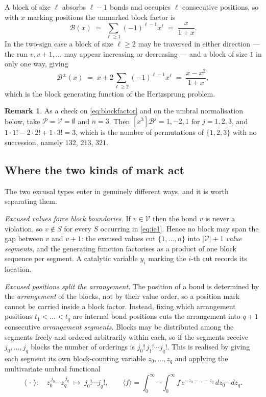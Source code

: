 \documentclass[11pt]{article}
\theoremstyle{definition}
\newtheorem{remark}[theorem]{Remark}
\begin{document}
A block of size $\ell$ absorbs $\ell-1$ bonds and occupies $\ell$ consecutive
positions, so with $x$ marking positions the unmarked block factor is
\begin{equation}\label{eq:blockfactor}
  \mathcal{B}(x)\;=\;\sum_{\ell\ge 1}(-1)^{\ell-1}x^{\ell}\;=\;\frac{x}{1+x} .
\end{equation}
In the two-sign case a block of size $\ell\ge 2$ may be traversed in either
direction --- the run $v,v+1,\dots$ may appear increasing or decreasing --- and
a block of size $1$ in only one way, giving
\begin{equation}\label{eq:blockfactorpm}
  \mathcal{B}^{\pm}(x)\;=\;x+2\sum_{\ell\ge 2}(-1)^{\ell-1}x^{\ell}
  \;=\;\frac{x-x^{2}}{1+x},
\end{equation}
which is the block generating function of the Hertzsprung problem.

\begin{remark}
As a check on \eqref{eq:blockfactor} and on the umbral normalisation below,
take $\mathcal{P}=\mathcal{V}=\emptyset$ and $n=3$. Then
$[x^{3}]\mathcal{B}^{j}=1,-2,1$ for $j=1,2,3$, and
$1\cdot 1!-2\cdot 2!+1\cdot 3!=3$, which is the number of permutations of
$\{1,2,3\}$ with no succession, namely $132$, $213$, $321$.
\end{remark}

\subsection*{Where the two kinds of mark act}

The two excusal types enter in genuinely different ways, and it is worth
separating them.

\emph{Excused values force block boundaries.} If $v\in\mathcal{V}$ then the
bond $v$ is never a violation, so $v\notin S$ for every $S$ occurring in
\eqref{eq:ie1}. Hence no block may span the gap between $v$ and $v+1$: the
excused values cut $\{1,\dots,n\}$ into $|\mathcal{V}|+1$ \emph{value
segments}, and the generating function factorises as a product of one block
sequence per segment. A catalytic variable $y_i$ marking the $i$-th cut records
its location.

\emph{Excused positions split the arrangement.} The position of a bond is
determined by the \emph{arrangement} of the blocks, not by their value order,
so a position mark cannot be carried inside a block factor. Instead, fixing
which arrangement positions $t_1<\dots<t_q$ are internal bond positions cuts
the arrangement into $q+1$ consecutive \emph{arrangement segments}. Blocks may
be distributed among the segments freely and ordered arbitrarily within each,
so if the segments receive $j_0,\dots,j_q$ blocks the number of orderings is
$j_0!\,j_1!\cdots j_q!$. This is realised by giving each segment its own
block-counting variable $z_0,\dots,z_q$ and applying the multivariate umbral
functional
\begin{equation}\label{eq:umbral}
  \bigl\langle\,\cdot\,\bigr\rangle:\quad
  z_0^{\,j_0}\cdots z_q^{\,j_q}\;\longmapsto\; j_0!\cdots j_q!,
  \qquad
  \langle f\rangle=\int_0^\infty\!\!\cdots\!\int_0^\infty
  f\,e^{-z_0-\dots-z_q}\,dz_0\cdots dz_q .
\end{equation}
\end{document}
